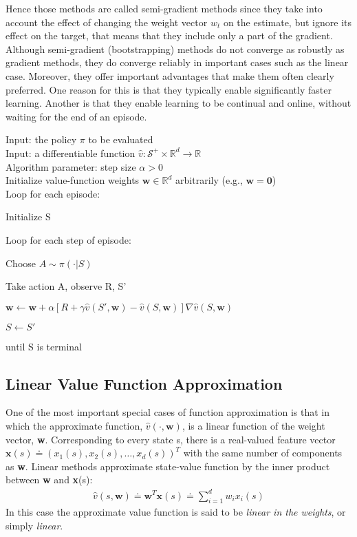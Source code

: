 Hence those methods are called semi-gradient methods since they take into account the effect of changing the weight vector $w_t$ on the estimate, but ignore its effect on the target, that means that they include only a part of the gradient. Although semi-gradient (bootstrapping) methods do not converge as robustly as gradient methods, they do converge reliably in important cases such as the linear case. Moreover, they offer important advantages that make them
often clearly preferred. One reason for this is that they typically enable significantly faster learning. Another is that they enable learning to be continual and online, without waiting for the end of an episode.
\begin{tcolorbox}[colback=black!7!white,colframe=black!75!white,title=\textbf{Semi-gradient TD(0) for Estimating} $\mathbf{\hat{v}\approx v_\pi}$]
Input: the policy $\pi$ to be evaluated\\
Input: a differentiable function $\hat{v}: \mathcal{S}^+\times\mathbb{R}^d\rightarrow\mathbb{R}$\\
Algorithm parameter: step size $\alpha > 0$\\
Initialize value-function weights $\mathbf{w}\in\mathbb{R}^d$ arbitrarily (e.g., $\mathbf{w=0}$)\\

Loop for each episode:

    \qquad Initialize S

    \qquad Loop for each step of episode:

    \qquad\qquad Choose $A\sim\pi(\cdot|S)$

    \qquad\qquad Take action A, observe R, S'

    \qquad\qquad $\mathbf{w}\leftarrow\mathbf{w}+\alpha[R+\gamma\hat{v}(S', \mathbf{w})-\hat{v}(S, \mathbf{w})]\nabla \hat{v}(S, \mathbf{w})$

    \qquad\qquad $S\leftarrow S'$

    \qquad until S is terminal
\end{tcolorbox}

\subsection{Linear Value Function Approximation}
One of the most important special cases of function approximation is that in which the approximate function, $\hat{v}(\cdot,\mathbf{w})$, is a linear function of the weight vector, \textbf{w}. Corresponding to every state s, there is a real-valued feature vector $\mathbf{x}(s)\doteq (x_1(s), x_2(s), \dots, x_d(s))^T$ with the same number of components as \textbf{w}. Linear methods approximate state-value function by the inner product between \textbf{w} and \textbf{x}(s):
\begin{align}
    \hat{v}(s,\mathbf{w})\doteq \mathbf{w}^T\mathbf{x}(s)\doteq\sum_{i=1}^d w_i x_i(s)
\end{align}
In this case the approximate value function is said to be \textit{linear in the weights}, or simply \textit{linear}.

